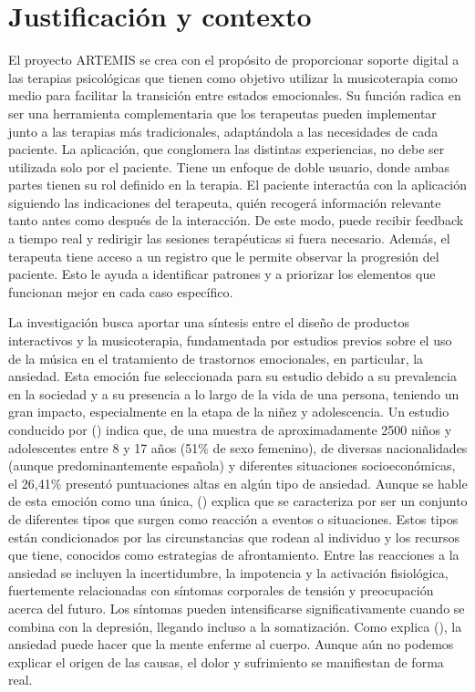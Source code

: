 \section{Justificación y contexto}

El proyecto ARTEMIS se crea con el propósito de proporcionar soporte digital a las terapias psicológicas que tienen como objetivo utilizar la musicoterapia como medio para facilitar la transición entre estados emocionales. Su función radica en ser una herramienta complementaria que los terapeutas pueden implementar junto a las terapias más tradicionales, adaptándola a las necesidades de cada paciente. La aplicación, que conglomera las distintas experiencias, no debe ser utilizada solo por el paciente. Tiene un enfoque de doble usuario, donde ambas partes tienen su rol definido en la terapia. El paciente interactúa con la aplicación siguiendo las indicaciones del terapeuta, quién recogerá información relevante tanto antes como después de la interacción. De este modo, puede recibir feedback a tiempo real y redirigir las sesiones terapéuticas si fuera necesario. Además, el terapeuta tiene acceso a un registro que le permite observar la progresión del paciente. Esto le ayuda a identificar patrones y a priorizar los elementos que funcionan mejor en cada caso específico.

La investigación busca aportar una síntesis entre el diseño de productos interactivos y la musicoterapia, fundamentada por estudios previos sobre el uso de la música en el tratamiento de trastornos emocionales, en particular, la ansiedad. Esta emoción fue seleccionada para su estudio debido a su prevalencia en la sociedad y a su presencia a lo largo de la vida de una persona, teniendo un gran impacto, especialmente en la etapa de la niñez y adolescencia. Un estudio conducido por \citeauthor{MO:2012} (\citeyear{MO:2012}) indica que, de una muestra de aproximadamente 2500 niños y adolescentes entre 8 y 17 años (51\% de sexo femenino), de diversas nacionalidades (aunque predominantemente española) y diferentes situaciones socioeconómicas, el 26,41\% presentó puntuaciones altas en algún tipo de ansiedad. Aunque se hable de esta emoción como una única, \citeauthor{CAGD:2010} (\citeyear{CAGD:2010}) explica que se caracteriza por ser un conjunto de diferentes tipos que surgen como reacción a eventos o situaciones. Estos tipos están condicionados por las circunstancias que rodean al individuo y los recursos que tiene, conocidos como estrategias de afrontamiento. Entre las reacciones a la ansiedad se incluyen la incertidumbre, la impotencia y la activación fisiológica, fuertemente relacionadas con síntomas corporales de tensión y preocupación acerca del futuro. Los síntomas pueden intensificarse significativamente cuando se combina con la depresión, llegando incluso a la somatización. Como explica \citeauthor{CJI:2017} (\citeyear{CJI:2017}), la ansiedad puede hacer que la mente enferme al cuerpo. Aunque aún no podemos explicar el origen de las causas, el dolor y sufrimiento se manifiestan de forma real. 

